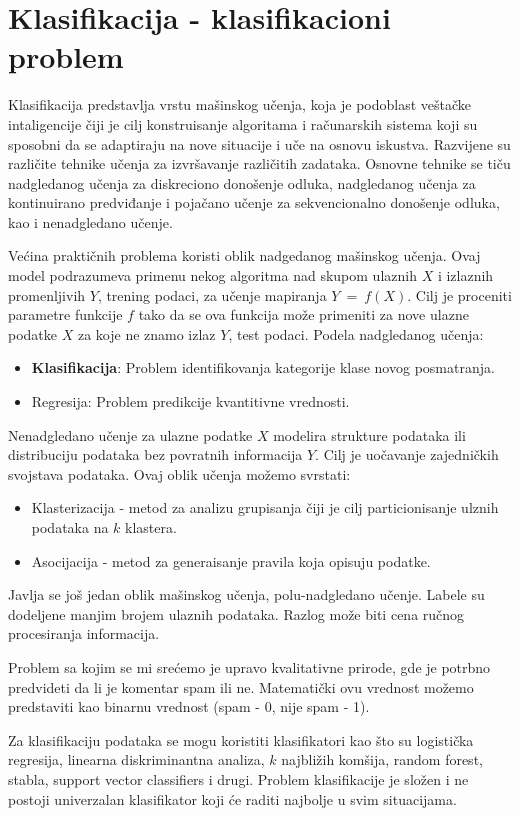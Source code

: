 \section{Klasifikacija - klasifikacioni problem}

Klasifikacija predstavlja vrstu mašinskog učenja, koja je podoblast veštačke intaligencije čiji je cilj konstruisanje
algoritama i računarskih sistema koji su sposobni da se adaptiraju na nove
situacije i uče na osnovu iskustva. Razvijene su različite tehnike učenja za
izvršavanje različitih zadataka. Osnovne tehnike se tiču nadgledanog učenja za
diskreciono donošenje odluka, nadgledanog učenja za kontinuirano predviđanje i
pojačano učenje za sekvencionalno donošenje odluka, kao i nenadgledano učenje.

Većina praktičnih problema koristi oblik nadgedanog mašinskog učenja.
Ovaj model podrazumeva primenu nekog algoritma nad skupom ulaznih $X$ i
izlaznih promenljivih $Y$, trening podaci, za učenje mapiranja $Y \ = \ f(X)$.
Cilj je proceniti parametre funkcije $f$ tako da se ova funkcija može primeniti
za nove ulazne podatke $X$ za koje ne znamo izlaz $Y$, test podaci. Podela
nadgledanog učenja:
\begin{itemize}
  \item \textbf{Klasifikacija}: Problem identifikovanja kategorije klase novog
  posmatranja.
  \item Regresija: Problem predikcije kvantitivne vrednosti.
\end{itemize}

Nenadgledano učenje za ulazne podatke $X$ modelira strukture podataka ili
distribuciju podataka bez povratnih informacija $Y$. Cilj je
uočavanje zajedničkih svojstava podataka. Ovaj oblik učenja možemo svrstati:
\begin{itemize}
  \item Klasterizacija - metod za analizu grupisanja čiji je cilj
  particionisanje ulznih podataka na $k$ klastera.
  \item Asocijacija - metod za generaisanje pravila koja opisuju podatke.
\end{itemize}

Javlja se još jedan oblik mašinskog učenja, polu-nadgledano učenje. Labele su
dodeljene manjim brojem ulaznih podataka. Razlog može biti cena ručnog
procesiranja informacija.

Problem sa kojim se mi srećemo je upravo kvalitativne prirode, gde je potrbno
predvideti da li je komentar spam ili ne. Matematički ovu vrednost možemo
predstaviti kao binarnu vrednost (spam - 0, nije spam - 1).

Za klasifikaciju podataka se mogu koristiti klasifikatori kao što su logistička
regresija, linearna diskriminantna analiza, $k$ najbližih komšija, random forest,
stabla, support vector classifiers i drugi. Problem klasifikacije je složen i ne
postoji univerzalan klasifikator koji će raditi najbolje u svim situacijama.
